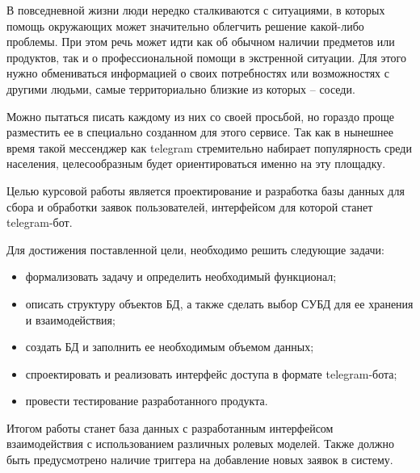 
В повседневной жизни люди нередко сталкиваются с ситуациями, в которых помощь окружающих может значительно облегчить решение какой-либо проблемы. При этом речь может идти как об обычном наличии предметов или продуктов, так и о профессиональной помощи в экстренной ситуации. Для этого нужно обмениваться информацией о своих потребностях или возможностях с другими людьми, самые территориально близкие из которых -- соседи. 

Можно пытаться писать каждому из них со своей просьбой, но гораздо проще разместить ее в специально созданном для этого сервисе. Так как в нынешнее время такой мессенджер как telegram \cite{telegram} стремительно набирает популярность среди населения, целесообразным будет ориентироваться именно на эту площадку.

Целью курсовой работы является проектирование и разработка базы данных для сбора и обработки заявок пользователей, интерфейсом для которой станет telegram-бот.

Для достижения поставленной цели, необходимо решить следующие задачи:
\begin{itemize}
	\item формализовать задачу и определить необходимый функционал;
	\item описать структуру объектов БД, а также сделать выбор СУБД для ее хранения и взаимодействия;
	\item создать БД и заполнить ее необходимым объемом данных;
	\item спроектировать и реализовать интерфейс доступа в формате telegram-бота;
	\item провести тестирование разработанного продукта.
\end{itemize}

Итогом работы станет база данных с разработанным интерфейсом взаимодействия с использованием различных ролевых моделей. Также должно быть предусмотрено наличие триггера на добавление новых заявок в систему.